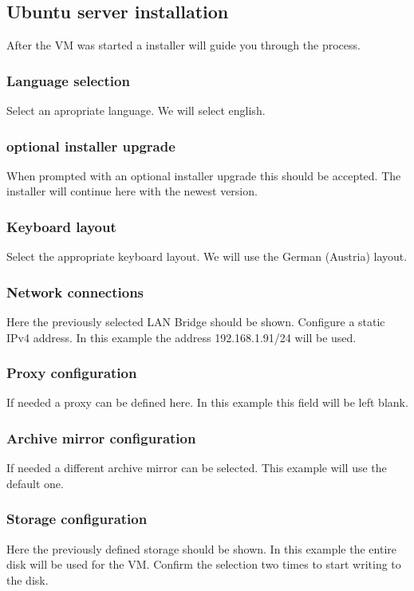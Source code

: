 \documentclass[10pt,a4paper]{article}
\begin{document}
\subsection{Ubuntu server installation}
After the VM was started a installer will guide you through the process.

\subsubsection{Language selection}
Select an apropriate language. We will select english.

\subsubsection{optional installer upgrade}
When prompted with an optional installer upgrade this should be accepted. The installer will continue here with the newest version.

\subsubsection{Keyboard layout}
Select the appropriate keyboard layout. We will use the German (Austria) layout.

\subsubsection{Network connections}
Here the previously selected LAN Bridge should be shown. Configure a static IPv4 address. In this example the address 192.168.1.91/24 will be used. 

\subsubsection{Proxy configuration}
If needed a proxy can be defined here. In this example this field will be left blank.

\subsubsection{Archive mirror configuration}
If needed a different archive mirror can be selected. This example will use the default one.

\subsubsection{Storage configuration}
Here the previously defined storage should be shown. In this example the entire disk will be used for the VM. Confirm the selection two times to start writing to the disk.
\end{document}
